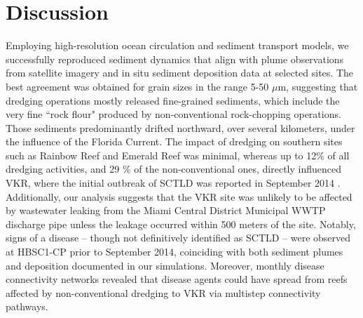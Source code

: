 \documentclass[preprint,12pt,authoryear]{elsarticle}
\begin{document}
\section{Discussion}


Employing high-resolution ocean circulation and sediment transport models, we successfully reproduced sediment dynamics that align with plume observations from satellite imagery and in situ sediment deposition data at selected sites. The best agreement was obtained for grain sizes in the range 5-50 $\mu$m, suggesting that dredging operations mostly released fine-grained sediments, which include the very fine ``rock flour" produced by non-conventional rock-chopping operations. Those sediments predominantly drifted northward, over several kilometers, under the influence of the Florida Current. The impact of dredging on southern sites such as Rainbow Reef and Emerald Reef was minimal, whereas up to 12\% of all dredging activities, and 29 \% of the non-conventional ones, directly influenced VKR, where the initial outbreak of SCTLD was reported in September 2014 \citep{precht2016unprecedented}. Additionally, our analysis suggests that the VKR site was unlikely to be affected by wastewater leaking from the Miami Central District Municipal WWTP discharge pipe unless the leakage occurred within 500 meters of the site. Notably, signs of a disease -- though not definitively identified as SCTLD -- were observed at HBSC1-CP prior to September 2014, coinciding with both sediment plumes and deposition documented in our simulations. Moreover, monthly disease connectivity networks revealed that disease agents could have spread from reefs affected by non-conventional dredging to VKR via multistep connectivity pathways.
\end{document}
